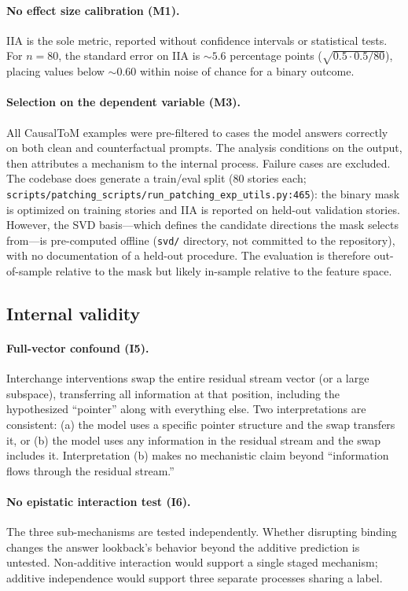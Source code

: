 \documentclass[11pt]{article}
\begin{document}
\paragraph{No effect size calibration (M1).}
IIA is the sole metric, reported without confidence intervals or statistical tests. For $n = 80$, the standard error on IIA is ${\sim}5.6$ percentage points ($\sqrt{0.5 \cdot 0.5 / 80}$), placing values below ${\sim}0.60$ within noise of chance for a binary outcome.

\paragraph{Selection on the dependent variable (M3).}
All CausalToM examples were pre-filtered to cases the model answers correctly on both clean and counterfactual prompts. The analysis conditions on the output, then attributes a mechanism to the internal process. Failure cases are excluded. The codebase does generate a train/eval split (80 stories each; \texttt{scripts/patching\_scripts/run\_patching\_exp\_utils.py:465}): the binary mask is optimized on training stories and IIA is reported on held-out validation stories. However, the SVD basis---which defines the candidate directions the mask selects from---is pre-computed offline (\texttt{svd/} directory, not committed to the repository), with no documentation of a held-out procedure. The evaluation is therefore out-of-sample relative to the mask but likely in-sample relative to the feature space.

\subsection{Internal validity}

\paragraph{Full-vector confound (I5).}
Interchange interventions swap the entire residual stream vector (or a large subspace), transferring all information at that position, including the hypothesized ``pointer'' along with everything else. Two interpretations are consistent: (a) the model uses a specific pointer structure and the swap transfers it, or (b) the model uses any information in the residual stream and the swap includes it. Interpretation (b) makes no mechanistic claim beyond ``information flows through the residual stream.''

\paragraph{No epistatic interaction test (I6).}
The three sub-mechanisms are tested independently. Whether disrupting binding changes the answer lookback's behavior beyond the additive prediction is untested. Non-additive interaction would support a single staged mechanism; additive independence would support three separate processes sharing a label.
\end{document}
